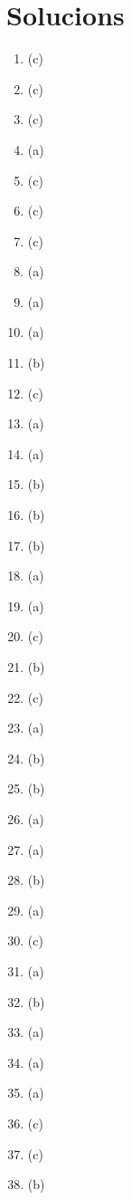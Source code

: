 \section{Solucions}
\begin{enumerate}
\item (c)
\item (c)
\item (c)
\item (a)
\item (c)
%
\item (c)
\item (c)
\item (a)
\item (a)
\item (a)
%
\item (b)
\item (c)
\item (a)
\item (a)
\item (b)
%
\item (b)
\item (b)
\item (a)
\item (a)
\item (c)
%
\item (b)
\item (c)
\item (a)
\item (b)
\item (b)
%
\item (a)
\item (a)
\item (b)
\item (a)
\item (c)
%
\item (a)
\item (b)
\item (a)
\item (a)
\item (a)
%
\item (c)
\item (c)
\item (b)
\end{enumerate}

